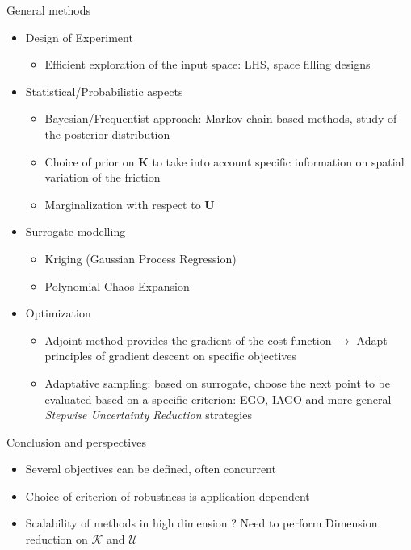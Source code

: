 \documentclass{beamer}
\newlength{\sndcolwid}
\begin{document}
\begin{frame}[t]
\begin{columns}[t]
\begin{column}{\sndcolwid}
\begin{block}{General methods}
\begin{itemize}
  \item Design of Experiment
    \begin{itemize}
    \item Efficient exploration of the input space: LHS, space filling designs
    \end{itemize}
  \item Statistical/Probabilistic aspects
    \begin{itemize}
    \item Bayesian/Frequentist approach: Markov-chain based methods, study of the posterior distribution
    \item Choice of prior on $\bm{K}$ to take into account specific information on spatial variation of the friction
    \item Marginalization with respect to $\bm{U}$
    \end{itemize}
  \item Surrogate modelling
    \begin{itemize}
    \item Kriging (Gaussian Process Regression)
    \item Polynomial Chaos Expansion
    \end{itemize}
  \item Optimization
    \begin{itemize}
    \item Adjoint method provides the gradient of the cost function $\rightarrow$ Adapt principles of gradient descent on specific objectives
    \item Adaptative sampling: based on surrogate, choose the next point to be evaluated based on a specific criterion: EGO, IAGO and more general \emph{Stepwise Uncertainty Reduction} strategies \nocite{jones_efficient_1998}
    \end{itemize}
  \end{itemize}
\end{block}

\begin{block}{Conclusion and perspectives}
  \begin{itemize}
  \item Several objectives can be defined, often concurrent
  \item Choice of criterion of robustness is application-dependent
  \item Scalability of methods in high dimension ? Need to perform \alert{Dimension reduction} on $\mathcal{K}$ and  $\mathcal{U}$
  \end{itemize}
\end{block}


\end{column}
\end{columns}
\end{frame}
\end{document}
